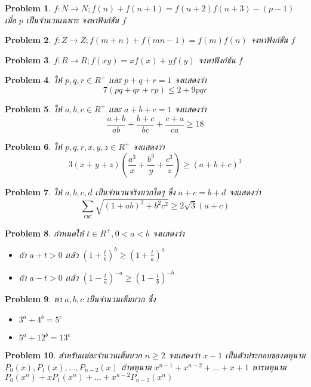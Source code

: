 \documentclass[a4paper,12pt]{article}
\newtheorem{problem}{Problem}
\begin{document}
	\begin{problem}
		$f:N\rightarrow{N} ; f(n)+f(n+1)=f(n+2)f(n+3)-(p-1)$ เมื่อ $p$ เป็นจำนวนเฉพาะ จงหาฟังก์ชัน $f$
	\end{problem}
	\begin{problem}
		$f:Z \rightarrow Z ; f(m+n)+f(mn-1)=f(m)f(n)$ จงหาฟังก์ชัน $f$
	\end{problem}
	\begin{problem}
		$f:R \rightarrow R ; f(xy)=xf(x)+yf(y)$ จงหาฟังก์ชัน $f$
	\end{problem}
	\begin{problem}
		ให้ $p,q,r \in R^+$ เเละ $p+q+r=1$ จงเเสดงว่า $$7(pq+qr+rp) \le 2+9pqr$$
	\end{problem}
	\begin{problem}
		ให้ $a,b,c \in R^+$ เเละ $a+b+c=1$ จงเเสดงว่า $$\frac{a+b}{ab}+\frac{b+c}{bc}+\frac{c+a}{ca} \ge 18$$
	\end{problem}
	\begin{problem}
		ให้ $p,q,r,x,y,z \in R^+$ จงเเสดงว่า $$3(x+y+z)(\frac{a^3}{x}+\frac{b^3}{y}+\frac{c^3}{z}) \ge (a+b+c)^3$$
	\end{problem}
	\begin{problem}
		ให้ $a,b,c,d$ เป็นจำนวนจริงบวกใดๆ ซึ่ง $a+c=b+d$ จงเเสดงว่า $$\sum_{cyc}\sqrt{(1+ab)^2+b^2c^2} \ge 2\sqrt{3}(a+c)$$
	\end{problem}
	\begin{problem}
		กำหนดให้ $t\in R^+, 0<a<b$ จงเเสดงว่า 
		\begin{itemize}
			\item ถ้า $a+t>0$ เเล้ว $(1+\frac{t}{b})^b \ge (1+\frac{t}{a})^a$
			\item ถ้า $a-t>0$ เเล้ว $(1-\frac{t}{a})^{-a} \ge (1-\frac{t}{b})^{-b}$
		\end{itemize}
	\end{problem}
	\begin{problem}
		หา $a,b,c$ เป็นจำนวนเต็มบวก ซึ่ง
		\begin{itemize}
			\item $3^a+4^b = 5^c$
			\item $5^a+12^b=13^c$
		\end{itemize}
	\end{problem}
	\begin{problem}
	สำหรับเเต่ละจำนวนเต็มบวก $n \ge 2$ จงเเสดงว่า $x-1$ เป็นตัวประกอบของพหุนาม $P_0(x), P_1(x), \dots , P_{n-2}(x)$ ถ้าพหุนาม $x^{n-1} +x^{n-2} +\dots+x+1$ หารพหุนาม $P_0(x^n) + xP_1(x^n)+\dots+x^{n-2}P_{n-2}(x^n)$
	\end{problem}
\end{document}

